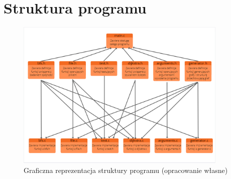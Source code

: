 \documentclass{article}
\begin{document}
\section{Struktura programu}
\begin{figure}[htp]
\centering
\includegraphics[width=0.9\textwidth]{modularna.png}
\caption{\label{fig:mod}Graficzna reprezentacja struktury programu (opracowanie własne)}
\end{figure}
\end{document}
